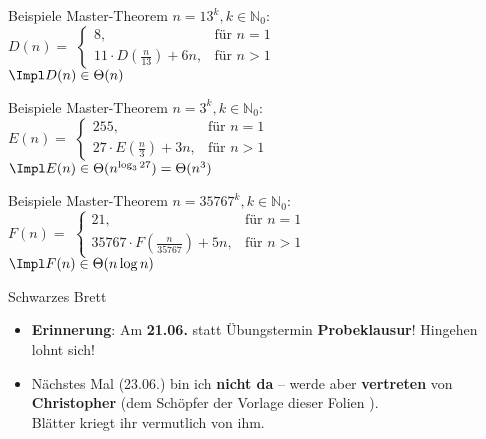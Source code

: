 \begin{frame}{Beispiele Master-Theorem}
	$n = 13^k, k \in \mathbb{N}_0$: \\[0,25cm]
	$D(n) = $
	\begin{math}
		\begin{cases}
		8,                              & \text{für } n = 1 \\
		11 \cdot D(\frac{n}{13}) + 6n,  & \text{für } n > 1
		\end{cases}
	\end{math} \\[0,5cm]
	\pause
	$\Impl D(n) \in \Theta(n)$
\end{frame}


\begin{frame}{Beispiele Master-Theorem}
	$n = 3^k, k \in \mathbb{N}_0$: \\[0,25cm]
	$E(n) = $ 
	\begin{math}
		\begin{cases}
		255,                            & \text{für } n = 1 \\
		27 \cdot E(\frac{n}{3}) + 3n,   & \text{für } n > 1
		\end{cases}
	\end{math} \\[0,5cm]
	\pause
	$\Impl E(n) \in \Theta(n^{\log _{3}27}) = \Theta(n^3)$
\end{frame}


\begin{frame}{Beispiele Master-Theorem}
	$n = 35767^k, k \in \mathbb{N}_0$: \\[0,25cm]
	$F(n) = $
	\begin{math}
		\begin{cases}
		21,                                   & \text{für } n = 1 \\
		35767 \cdot F(\frac{n}{35767}) + 5n,  & \text{für } n > 1
		\end{cases}
	\end{math} \\[0,5cm]
	\pause
	$\Impl F(n) \in \Theta(n\log n)$
\end{frame}

\fi


\begin{frame}{Schwarzes Brett}
	\begin{itemize}
		\item \textbf{Erinnerung}: Am \textbf{21.06.} statt Übungstermin \textbf{Probeklausur}! Hingehen lohnt sich!
		\item Nächstes Mal (23.06.) bin ich \textbf{nicht da} – werde aber \textbf{vertreten} von \textbf{Christopher} (dem Schöpfer der Vorlage dieser Folien \smiley). \\
		Blätter kriegt ihr vermutlich von ihm.
	\end{itemize}
\end{frame}


